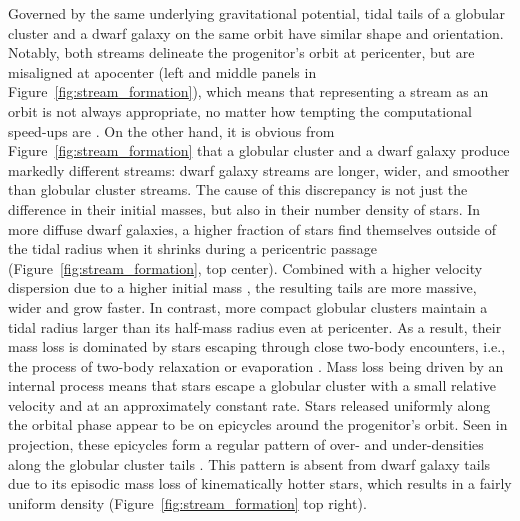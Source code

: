 \documentclass[final,5p,times,twocolumn,authoryear]{elsarticle}
\begin{document}
Governed by the same underlying gravitational potential, tidal tails of a globular cluster and a dwarf galaxy on the same orbit have similar shape and orientation.
Notably, both streams delineate the progenitor's orbit at pericenter, but are misaligned at apocenter (left and middle panels in Figure~\ref{fig:stream_formation}), which means that representing a stream as an orbit is not always appropriate, no matter how tempting the computational speed-ups are \citep{eyre:2009, eyre:2011, sanders:2013a, sanders:2013b}.
On the other hand, it is obvious from Figure~\ref{fig:stream_formation} that a globular cluster and a dwarf galaxy produce markedly different streams: dwarf galaxy streams are longer, wider, and smoother than globular cluster streams.
The cause of this discrepancy is not just the difference in their initial masses, but also in their number density of stars.
In more diffuse dwarf galaxies, a higher fraction of stars find themselves outside of the tidal radius when it shrinks during a pericentric passage (Figure~\ref{fig:stream_formation}, top center).
Combined with a higher velocity dispersion due to a higher initial mass \citep[cf.][]{simon:2007, baumgardt:2019}, the resulting tails are more massive, wider and grow faster.
In contrast, more compact globular clusters maintain a tidal radius larger than its half-mass radius even at pericenter.
As a result, their mass loss is dominated by stars escaping through close two-body encounters, i.e., the process of two-body relaxation or evaporation \citep{gnedin:1997,vesperini:1997,baumgardt:2003}.
Mass loss being driven by an internal process means that stars escape a globular cluster with a small relative velocity and at an approximately constant rate.
Stars released uniformly along the orbital phase appear to be on epicycles around the progenitor's orbit.
Seen in projection, these epicycles form a regular pattern of over- and under-densities along the globular cluster tails \citep[Figure~\ref{fig:stream_formation}, bottom right;][]{kupper:2008, kupper:2010, just:2009}.
This pattern is absent from dwarf galaxy tails due to its episodic mass loss of kinematically hotter stars, which results in a fairly uniform density (Figure~\ref{fig:stream_formation} top right).
\end{document}

